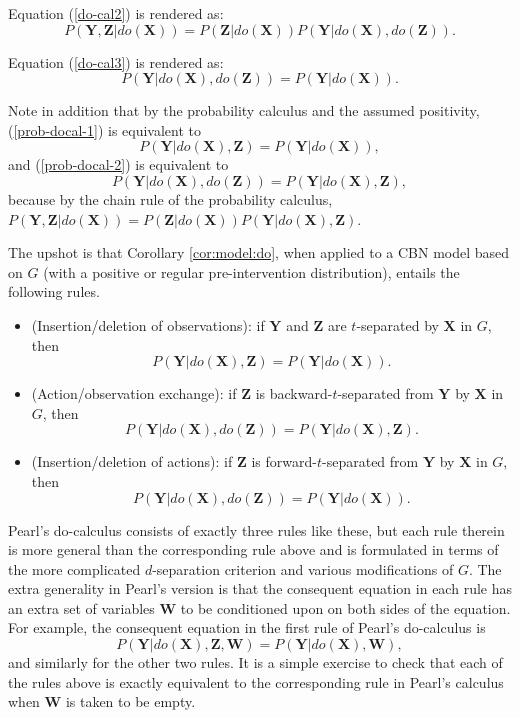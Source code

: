 \documentclass[12pt]{amsart}
\theoremstyle{plain}
\theoremstyle{definition}
\theoremstyle{remark}
\numberwithin{equation}{section}
\theoremstyle{plain}
\newcommand{\0}{\emptyset}
\begin{document}
Equation (\ref{do-cal2}) is rendered as:
\begin{equation}
\label{prob-docal-2}
P(\mathbf{Y}, \mathbf{Z} | do(\mathbf{X})) = P(\mathbf{Z}| do(\mathbf{X}))P(\mathbf{Y} | do(\mathbf{X}), do(\mathbf{Z})).
\end{equation}

Equation (\ref{do-cal3}) is rendered as:  \begin{equation}
\label{prob-docal-3}
P(\mathbf{Y}| do(\mathbf{X}), do(\mathbf{Z})) = P(\mathbf{Y}| do(\mathbf{X})).
\end{equation}

Note in addition that by the probability calculus and the assumed positivity, (\ref{prob-docal-1}) is equivalent to \[
P(\mathbf{Y} | do(\mathbf{X}), \mathbf{Z}) = P(\mathbf{Y} | do(\mathbf{X})),
\]
and (\ref{prob-docal-2}) is equivalent to \[
P(\mathbf{Y} | do(\mathbf{X}), do(\mathbf{Z})) = P(\mathbf{Y} | do(\mathbf{X}), \mathbf{Z}),
\] because by the chain rule of the probability calculus, $P(\mathbf{Y}, \mathbf{Z} | do(\mathbf{X})) = P(\mathbf{Z}| do(\mathbf{X}))P(\mathbf{Y} | do(\mathbf{X}), \mathbf{Z})$.

The upshot is that Corollary \ref{cor:model:do}, when applied to a CBN model based on $G$ (with a positive or regular pre-intervention distribution), entails the following rules.
\begin{itemize}
    \item[{\it Rule 1}] (Insertion/deletion of observations): if $\mathbf{Y}$ and $\mathbf{Z}$ are $t$-separated by $\mathbf{X}$ in $G$, then \[ P(\mathbf{Y} | do(\mathbf{X}), \mathbf{Z}) = P(\mathbf{Y} | do(\mathbf{X})). \]

    \item[{\it Rule 2}] (Action/observation exchange): if $\mathbf{Z}$ is backward-$t$-separated from $\mathbf{Y}$ by $\mathbf{X}$ in $G$, then \[ P(\mathbf{Y} | do(\mathbf{X}), do(\mathbf{Z})) = P(\mathbf{Y} | do(\mathbf{X}), \mathbf{Z}). \]

    \item[{\it Rule 3}] (Insertion/deletion of actions): if $\mathbf{Z}$ is forward-$t$-separated from $\mathbf{Y}$ by $\mathbf{X}$ in $G$, then \[ P(\mathbf{Y} | do(\mathbf{X}), do(\mathbf{Z})) = P(\mathbf{Y} | do(\mathbf{X})). \]

\end{itemize}

Pearl's do-calculus \cite{Pearl1995} consists of exactly three rules like these, but each rule therein is more general than the corresponding rule above and is formulated in terms of the more complicated $d$-separation criterion and various modifications of $G$. The extra generality in Pearl's version is that the consequent equation in each rule has an extra set of variables $\mathbf{W}$ to be conditioned upon on both sides of the equation. For example, the consequent equation in the first rule of Pearl's do-calculus is \[ P(\mathbf{Y} | do(\mathbf{X}), \mathbf{Z}, \mathbf{W}) = P(\mathbf{Y} | do(\mathbf{X}), \mathbf{W}), \]
and similarly for the other two rules. It is a simple exercise to check that each of the rules above is exactly equivalent to the corresponding rule in Pearl's calculus when $\mathbf{W}$ is taken to be empty.
\end{document}
